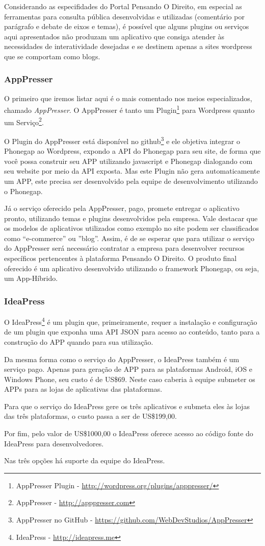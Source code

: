 Considerando as especifidades do Portal Pensando O Direito, em especial as ferramentas para consulta pública desenvolvidas e utilizadas (comentário por parágrafo e debate de eixos e temas), é possível que alguns plugins ou serviços aqui apresentados não produzam um aplicativo que consiga atender às necessidades de interatividade desejadas e se destinem apenas a sites wordpress que se comportam como blogs.

\subsubsection{AppPresser}
O primeiro que iremos listar aqui é o mais comentado nos meios especializados, chamado \textit{AppPresser}. O AppPresser é tanto um Plugin\footnote{AppPresser Plugin - \url{http://wordpress.org/plugins/apppresser/}} para Wordpress quanto um Serviço\footnote{AppPresser - \url{http://apppresser.com}}.

O Plugin do AppPresser está disponível no github\footnote{AppPresser no GitHub - \url{https://github.com/WebDevStudios/AppPresser}} e ele objetiva integrar o Phonegap ao Wordpress, expondo a API do Phonegap para seu site, de forma que você possa construir seu APP utilizando javascript e Phonegap dialogando com seu website por meio da API exposta. Mas este Plugin não gera automaticamente um APP, este precisa ser desenvolvido pela equipe de desenvolvimento utilizando o Phonegap.

Já o serviço oferecido pela AppPresser, pago, promete entregar o aplicativo pronto, utilizando temas e plugins desenvolvidos pela empresa. Vale destacar que os modelos de aplicativos utilizados como exemplo no site podem ser classificados como ``e-commerce'' ou ''blog''. Assim, é de se esperar que para utilizar o serviço do AppPresser será necessário contratar a empresa para desenvolver recursos específicos pertencentes à plataforma Pensando O Direito. O produto final oferecido é um aplicativo desenvolvido utilizando o framework Phonegap, ou seja, um App-Híbrido.

\subsubsection{IdeaPress}
O IdeaPress\footnote{IdeaPress - \url{http://ideapress.me}} é um plugin que, primeiramente, requer a instalação e configuração de um plugin que exponha uma API JSON para acesso ao conteúdo, tanto para a construção do APP quando para sua utilização.

Da mesma forma como o serviço do AppPresser, o IdeaPress também é um serviço pago. Apenas para geração de APP para as plataformas Android, iOS e Windows Phone, seu custo é de US\$69. Neste caso caberia à equipe submeter os APPs para as lojas de aplicativas das plataformas.

Para que o serviço do IdeaPress gere os três aplicativos e submeta eles às lojas das três plataformas, o custo passa a ser de US\$199,00.

Por fim, pelo valor de US\$1000,00 o IdeaPress oferece acesso ao código fonte do IdeaPress para desenvolvedores.

Nas três opções há suporte da equipe do IdeaPress.